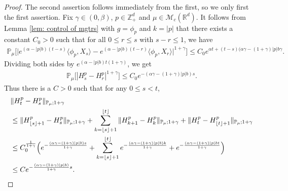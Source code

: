 \documentclass[12pt,a4paper]{amsart}
\theoremstyle{plain}
\theoremstyle{definition}
\numberwithin{equation}{section}
\begin{document}
\begin{proof}
    The second assertion follows immediately from the first, so we only first the first assertion.
    Fix $\gamma \in (0,\beta)$, $p\in \mathbb{Z}_+^d$ and $\mu\in \mathcal M_c(\mathbb R^d)$.
    It follows from Lemma \ref{lem: control of mgtrs} with $g=\phi_p$ and $k=|p|$ that there exists a constant $C_0>0$ such that for all $0\leq r\leq s $ with $s-r\leq1$, we have
\begin{align}
    \mathbb{P}_{\mu}\big[\big|e^{(\alpha-|p|b)(t-s)}\langle\phi_p, X_s\rangle-e^{(\alpha-|p|b)(t-r)}\langle\phi_p, X_r\rangle\big|^{1+\gamma}\big]
    \leq C_0e^{\alpha t+(t-s)(\alpha\gamma-(1+\gamma)|p|b\gamma}.
\end{align}
    Dividing both sides by $e^{(\alpha-|p|b) t(1+\gamma)}$, we get
\begin{align}
    \mathbb{P}_{\mu}\big[|H^p_s-H^p_r|^{1+\gamma}\big]
    \leq  C_0 e^{-(\alpha\gamma-(1+\gamma)|p|b)s}.
\end{align}
    Thus there is a $C>0$ such that for any $0\leq s<t$,
\begin{align}
	& \|H^p_t-H^p_s\|_{\mathbb{P}_{\mu};1+\gamma}
	\\&\leq \|H^p_{\lfloor s \rfloor+1}-H^p_s\|_{\mathbb{P}_{\mu};1+\gamma}+\sum_{k=\lfloor s \rfloor+1}^{\lfloor t \rfloor}\|H^p_{k+1}-H^p_{k}\|_{\mathbb{P}_{\mu};1+\gamma}+\|H^p_t-H^p_{\lfloor t \rfloor+1}\|_{\mathbb{P}_{\mu};1+\gamma}
	\\& \leq C_0^{\frac{1}{1+\gamma}} \Big(e^{-\frac{(\alpha \gamma-(1+\gamma)|p|b) s}{1+\gamma}}+\sum_{k=\lfloor s \rfloor+1}^{\lfloor t \rfloor}e^{-\frac{(\alpha \gamma-(1+\gamma)|p|b) k}{1+\gamma}}+ e^{-\frac{(\alpha \gamma-(1+\gamma)|p|b t}{1+\gamma}}\Big)
	\\&\leq Ce^{-\frac{(\alpha \gamma-(1+\gamma)|p|b)}{1+\gamma}s}.
    \qedhere
\end{align}	
\end{proof}
\end{document}
